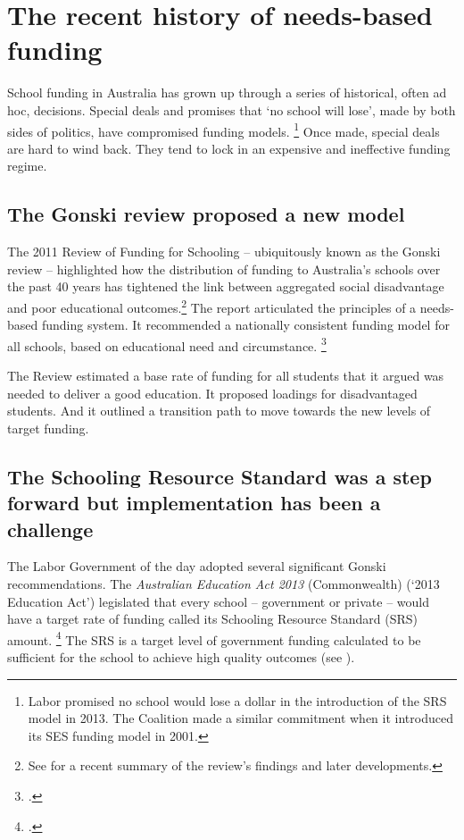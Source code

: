 \documentclass{grattan}
\begin{document}
\section{The recent history of needs-based funding}\label{sec:politics-has-got-in-the-way-of-good-policy}

School funding in Australia has grown up through a series of historical, often ad hoc, decisions. Special deals and promises that `no school will lose', made by both sides of politics, have compromised funding models.%
\footnote{Labor promised no school would lose a dollar in the introduction of the SRS model in 2013.
The Coalition made a similar commitment when it introduced its SES funding model in 2001.}
Once made, special deals are hard to wind back.
They tend to lock in an expensive and ineffective funding regime.

\subsection{The Gonski review proposed a new model}\label{subsec:the-gonski-principles-should-be-the-goal}

The 2011 Review of Funding for Schooling -- ubiquitously known as the Gonski review -- highlighted how the distribution of funding to Australia's schools over the past 40 years has tightened the link between aggregated social disadvantage and poor educational outcomes.\footnote{See \textcite{Boston2016WhatGonskiReally} for a recent summary of the review's findings and later developments.}
The report articulated the principles of a needs-based funding system.
It recommended a nationally consistent funding model for all schools, based on educational need and circumstance.%
\footcite[][xxi]{Gonski2011ReviewFundingSchooling}

The Review estimated a base rate of funding for all students that it argued was needed to deliver a good education.
It proposed loadings for disadvantaged students.
And it outlined a transition path to move towards the new levels of target funding.

\subsection{The Schooling Resource Standard was a step forward but implementation has been a challenge}\label{subsec:the-schooling-resource-standard-was-a-stepforward-but-needs-review}

The Labor Government of the day adopted several significant Gonski recommendations.
The \emph{Australian Education Act 2013} (Commonwealth) (`2013 Education Act') legislated that every school -- government or private -- would have a target rate of funding called its Schooling Resource Standard (SRS) amount.%
\footcite{2013AustralianEducationAct}
The SRS is a target level of government funding calculated to be sufficient for the school to achieve high quality outcomes (see ).
\end{document}
